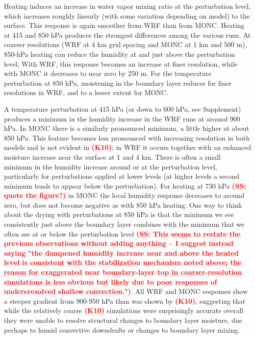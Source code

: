 \documentclass[draft]{agujournal2019}
\newcommand{\todo}[1]{\textcolor{red}{\textbf{(#1)}}}
\begin{document}
Heating induces an increase in water vapor mixing ratio at the
perturbation level, which increases roughly linearly (with some variation
depending on model) to the surface. This response is again smoother from WRF than from MONC. Heating at 415 and 850 hPa produces the strongest differences
among the various runs. At coarser resolutions (WRF at 4 km grid spacing and MONC at 1 km
and 500 m), 850-hPa heating can reduce the humidity at and just
above the perturbation level; With WRF, this response becomes an increase at
finer resolution, while with MONC it decreases to near zero by 250 m. For the
temperature perturbation at 850 hPa, moistening in the boundary layer reduces
for finer resolutions in WRF, and to a lesser extent for MONC. 

A temperature perturbation at 415 hPa (or down to 600 hPa, see Supplement) produces a minimum in the humidity increase in
the WRF runs at around 900 hPa. In MONC there is a similarly pronounced minimum,
a little higher at about 850 hPa. This feature becomes less pronounced with increasing resolution in both models and is not evident in \todo{K10}; in WRF it occurs together with an enhanced moisture increase near the surface at 1 and 4 km. There is often a small minimum
in the humidity increase around or at the perturbation level,
particularly for perturbations applied at lower levels (at higher levels a
second minimum tends to appear below the perturbation). For heating at 730 hPa \todo{SS: quote the figure?} in MONC the local humidity response decreases to around zero, but does not become negative as with 850 hPa heating. One way to think about the
drying with perturbations at 850 hPa is that the minimum we see consistently
just above the boundary layer combines with the minimum that we often see at or
below the perturbation level \todo{SS: This seems to restate the previous observations without adding anything -- I suggest instead saying "the dampened humidity increase near and above the heated level is consistent with the stabilization mechanism noted above; the reason for exaggerated near boundary-layer top in coarser-resolution simulations is less obvious but likely due to poor responses of undereresolved shallow convection."}.  All WRF and MONC responses show a steeper gradient from 900-950 hPa than was shown by \todo{K10}, suggesting that while the relatively coarse \todo{K10} simulations were surprisingly accurate overall they were unable to resolve structural changes to boundary layer moisture, due perhaps to humid convective downdrafts or changes to boundary layer mixing.
\end{document}
